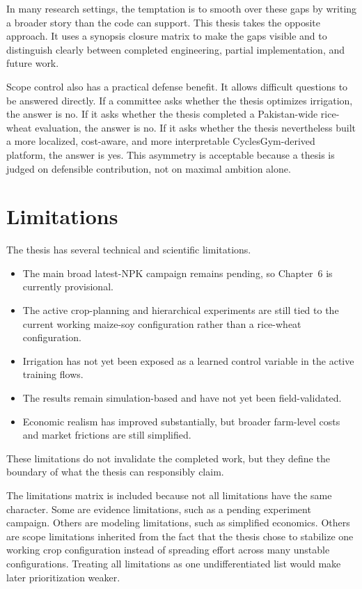 In many research settings, the temptation is to smooth over these gaps by writing a broader story than the code can support. This thesis takes the opposite approach. It uses a synopsis closure matrix to make the gaps visible and to distinguish clearly between completed engineering, partial implementation, and future work.



Scope control also has a practical defense benefit. It allows difficult questions to be answered directly. If a committee asks whether the thesis optimizes irrigation, the answer is no. If it asks whether the thesis completed a Pakistan-wide rice-wheat evaluation, the answer is no. If it asks whether the thesis nevertheless built a more localized, cost-aware, and more interpretable CyclesGym-derived platform, the answer is yes. This asymmetry is acceptable because a thesis is judged on defensible contribution, not on maximal ambition alone.

\section{Limitations}

The thesis has several technical and scientific limitations.
\begin{itemize}[leftmargin=1.2cm]
    \item The main broad latest-NPK campaign remains pending, so Chapter~6 is currently provisional.
    \item The active crop-planning and hierarchical experiments are still tied to the current working maize-soy configuration rather than a rice-wheat configuration.
    \item Irrigation has not yet been exposed as a learned control variable in the active training flows.
    \item The results remain simulation-based and have not yet been field-validated.
    \item Economic realism has improved substantially, but broader farm-level costs and market frictions are still simplified.
\end{itemize}

These limitations do not invalidate the completed work, but they define the boundary of what the thesis can responsibly claim.



The limitations matrix is included because not all limitations have the same character. Some are evidence limitations, such as a pending experiment campaign. Others are modeling limitations, such as simplified economics. Others are scope limitations inherited from the fact that the thesis chose to stabilize one working crop configuration instead of spreading effort across many unstable configurations. Treating all limitations as one undifferentiated list would make later prioritization weaker.

